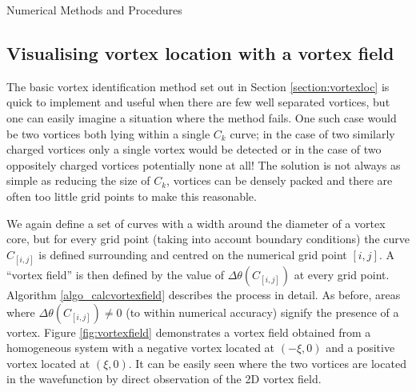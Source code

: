 \begin{chapter}{\label{cha:numerics}Numerical Methods and Procedures}
\subsection{\label{section:vortexfield} Visualising vortex location with a vortex field}
The basic vortex identification method set out in Section \ref{section:vortexloc} is quick to implement and useful when there are few well separated vortices, but one can easily imagine a situation where the method fails. One such case would be two vortices both lying within a single $C_k$ curve; in the case of two similarly charged vortices only a single vortex would be detected or in the case of two oppositely charged vortices potentially none at all! The solution is not always as simple as reducing the size of $C_k$, vortices can be densely packed and there are often too little grid points to make this reasonable.

We again define a set of curves with a width around the diameter of a vortex core, but for every grid point (taking into account boundary conditions) the curve $C_{[i,j]}$ is defined surrounding and centred on the numerical grid point $[i,j]$. A ``vortex field'' is then defined by the value of $\Delta\theta(C_{[i,j]})$ at every grid point. Algorithm \ref{algo_calcvortexfield} describes the process in detail. As before, areas where $\Delta\theta(C_{[i,j]}) \neq 0$ (to within numerical accuracy) signify the presence of a vortex. Figure \ref{fig:vortexfield} demonstrates a vortex field obtained from a homogeneous system with a negative vortex located at $(-\xi,0)$ and a positive vortex located at $(\xi,0)$. It can be easily seen where the two vortices are located in the wavefunction by direct observation of the 2D vortex field.
\begin{figure}
  \centering
\end{figure}
\end{chapter}
